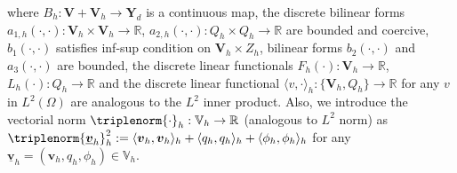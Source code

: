 \documentclass[smallextended]{svjour3}
\numberwithin{equation}{section}
\numberwithin{figure}{section}
\numberwithin{table}{section}
\newcommand\bV{\mathbf{V}}
\newcommand\bPi{\boldsymbol{\Pi}}
\newcommand\buv{\underline{\boldsymbol{v}}}
\newcommand\bx{\boldsymbol{x}}
\newcommand\by{\boldsymbol{y}}
\newcommand\bu{\boldsymbol{u}}
\newcommand\bv{\boldsymbol{v}}
\newcommand\bz{\boldsymbol{z}}
\newcommand{\bY}{\boldsymbol{Y}}
\newcommand\cT{\mathcal{T}}
\newcommand{\bbV}{\mathbb{V}}
\newcommand{\bbR}{\mathbb{R}}
\begin{document}
	where $B_h: \bV+\bV_h \to \bY_{d}$ is a continuous map, the discrete bilinear forms $a_{1,h}( \cdot, \cdot): \bV_h \times \bV_h \to \bbR$, $a_{2,h}( \cdot, \cdot): Q_h \times Q_h \to \bbR$ are bounded and coercive, $b_1(\cdot, \cdot)$ satisfies inf-sup condition on $\bV_h \times Z_h$, bilinear forms $b_2(\cdot, \cdot)$ and $a_3(\cdot, \cdot)$ are bounded, the discrete linear functionals $F_h(\cdot): \bV_h \to \bbR$, $L_h(\cdot): Q_h \to \bbR$ and the discrete linear functional $\langle v , \cdot \rangle_h: \{\bV_h,Q_h\} \to \bbR$ for any $v$ in $L^2(\Omega)$ are analogous to the $L^2$ inner product. Also, we introduce 
    the vectorial norm $\triplenorm{\cdot}_h: \bbV_h \to \bbR$ (analogous to $L^2$ norm) as
    $\triplenorm{\buv_h}_h^2:= \langle \bv_h, \bv_h\rangle_h + \langle q_h, q_h \rangle_h + \langle\phi_h, \phi_h \rangle_h$ for any $\buv_h=(\bv_h, q_h, \phi_h) \in \bbV_h$.

    
	
	
	
\end{document}
